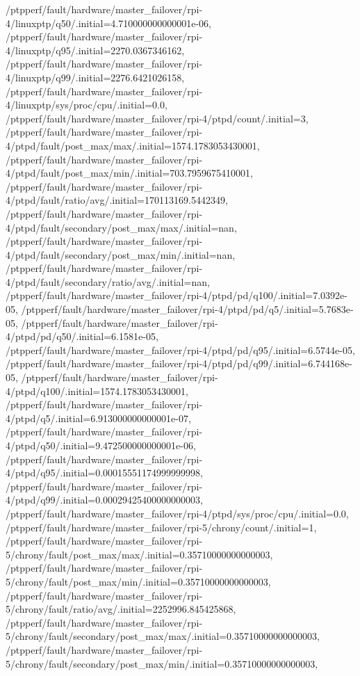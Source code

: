 {    /ptpperf/fault/hardware/master_failover/rpi-4/linuxptp/q50/.initial=4.710000000000001e-06,
    /ptpperf/fault/hardware/master_failover/rpi-4/linuxptp/q95/.initial=2270.0367346162,
    /ptpperf/fault/hardware/master_failover/rpi-4/linuxptp/q99/.initial=2276.6421026158,
    /ptpperf/fault/hardware/master_failover/rpi-4/linuxptp/sys/proc/cpu/.initial=0.0,
    /ptpperf/fault/hardware/master_failover/rpi-4/ptpd/count/.initial=3,
    /ptpperf/fault/hardware/master_failover/rpi-4/ptpd/fault/post_max/max/.initial=1574.1783053430001,
    /ptpperf/fault/hardware/master_failover/rpi-4/ptpd/fault/post_max/min/.initial=703.7959675410001,
    /ptpperf/fault/hardware/master_failover/rpi-4/ptpd/fault/ratio/avg/.initial=170113169.5442349,
    /ptpperf/fault/hardware/master_failover/rpi-4/ptpd/fault/secondary/post_max/max/.initial=nan,
    /ptpperf/fault/hardware/master_failover/rpi-4/ptpd/fault/secondary/post_max/min/.initial=nan,
    /ptpperf/fault/hardware/master_failover/rpi-4/ptpd/fault/secondary/ratio/avg/.initial=nan,
    /ptpperf/fault/hardware/master_failover/rpi-4/ptpd/pd/q100/.initial=7.0392e-05,
    /ptpperf/fault/hardware/master_failover/rpi-4/ptpd/pd/q5/.initial=5.7683e-05,
    /ptpperf/fault/hardware/master_failover/rpi-4/ptpd/pd/q50/.initial=6.1581e-05,
    /ptpperf/fault/hardware/master_failover/rpi-4/ptpd/pd/q95/.initial=6.5744e-05,
    /ptpperf/fault/hardware/master_failover/rpi-4/ptpd/pd/q99/.initial=6.744168e-05,
    /ptpperf/fault/hardware/master_failover/rpi-4/ptpd/q100/.initial=1574.1783053430001,
    /ptpperf/fault/hardware/master_failover/rpi-4/ptpd/q5/.initial=6.913000000000001e-07,
    /ptpperf/fault/hardware/master_failover/rpi-4/ptpd/q50/.initial=9.472500000000001e-06,
    /ptpperf/fault/hardware/master_failover/rpi-4/ptpd/q95/.initial=0.00015551174999999998,
    /ptpperf/fault/hardware/master_failover/rpi-4/ptpd/q99/.initial=0.00029425400000000003,
    /ptpperf/fault/hardware/master_failover/rpi-4/ptpd/sys/proc/cpu/.initial=0.0,
    /ptpperf/fault/hardware/master_failover/rpi-5/chrony/count/.initial=1,
    /ptpperf/fault/hardware/master_failover/rpi-5/chrony/fault/post_max/max/.initial=0.35710000000000003,
    /ptpperf/fault/hardware/master_failover/rpi-5/chrony/fault/post_max/min/.initial=0.35710000000000003,
    /ptpperf/fault/hardware/master_failover/rpi-5/chrony/fault/ratio/avg/.initial=2252996.845425868,
    /ptpperf/fault/hardware/master_failover/rpi-5/chrony/fault/secondary/post_max/max/.initial=0.35710000000000003,
    /ptpperf/fault/hardware/master_failover/rpi-5/chrony/fault/secondary/post_max/min/.initial=0.35710000000000003,
}

